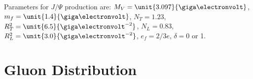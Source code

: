 \documentclass[a4paper,12pt,twoside]{article}
\begin{document}
Parameters for $J/\Psi$ production are: $M_V = \unit{3.097}{\giga\electronvolt}$, $m_f = \unit{1.4}{\giga\electronvolt}$, $N_T = 1.23$, $R_T^2 = \unit{6.5}{\giga\electronvolt^{-2}}$, $N_L=0.83$, $R_L^2 = \unit{3.0}{\giga\electronvolt^{-2}}$, $e_f = 2/3 e$, $\delta = 0$ or 1.
\section{Gluon Distribution}
\label{gdist}


\end{document}
